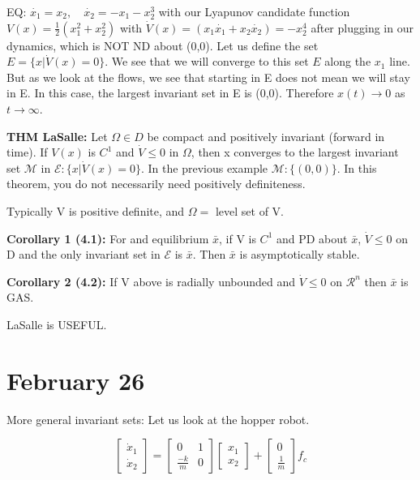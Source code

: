 \documentclass[11pt]{article}
\begin{document}
EQ: $\dot{x_1} = x_2, \quad \dot{x_2} = -x_1 - x_2^3$ with our Lyapunov candidate function $V(x)= \frac{1}{2}(x_1^2 +x_2^2)$ with $\dot{V}(x) = (x_1 \dot{x_1} + x_2 \dot{x_2}) = -x_2^4$ after plugging in our dynamics, which is NOT ND about (0,0). Let us define the set $E=\{ x \rvert \dot{V}(x) = 0 \}$. We see that we will converge to this set $E$ along the $x_1$ line. But as we look at the flows, we see that starting in E does not mean we will stay in E. In this case, the largest invariant set in E is (0,0). Therefore $x(t) \rightarrow 0 $ as $t \rightarrow \infty$.

\textbf{THM LaSalle:} Let $\Omega \in D$ be compact and positively invariant (forward in time). If $V(x)$ is $C^1$ and $\dot{V} \leq 0$ in $\Omega$, then x converges to the largest invariant set $\mathcal{M}$ in $\mathcal{E}:\{ x \rvert \dot{V}(x) =0 \}$. In the previous example $\mathcal{M} : \{ (0,0) \}$. In this theorem, you do not necessarily need positively definiteness. 

Typically V is positive definite, and $\Omega = $ level set of V.

\textbf{Corollary 1 (4.1):} For and equilibrium $\bar{x}$, if V is $C^1$ and PD about $\bar{x}$, $\dot{V}\leq 0$ on D and the only invariant set in $\mathcal{E}$ is $\bar{x}$. Then $\bar{x}$ is asymptotically stable.

\textbf{Corollary 2 (4.2):} If V above is radially unbounded and $\dot{V} \leq 0$ on $\mathcal{R}^n$ then $\bar{x}$ is GAS.

LaSalle is USEFUL.




\section{February 26}
More general invariant sets: Let us look at the hopper robot.

\begin{equation}
\begin{bmatrix}
\dot{x}_1 \\
\dot{x}_2
\end{bmatrix}
 = 
\begin{bmatrix}
0 & 1 \\
\frac{-k}{m} & 0
\end{bmatrix}
\begin{bmatrix}
{x}_1 \\
{x}_2
\end{bmatrix}
+
\begin{bmatrix}
0 \\
\frac{1}{m}
\end{bmatrix}
f_c
\end{equation}
\end{document}
